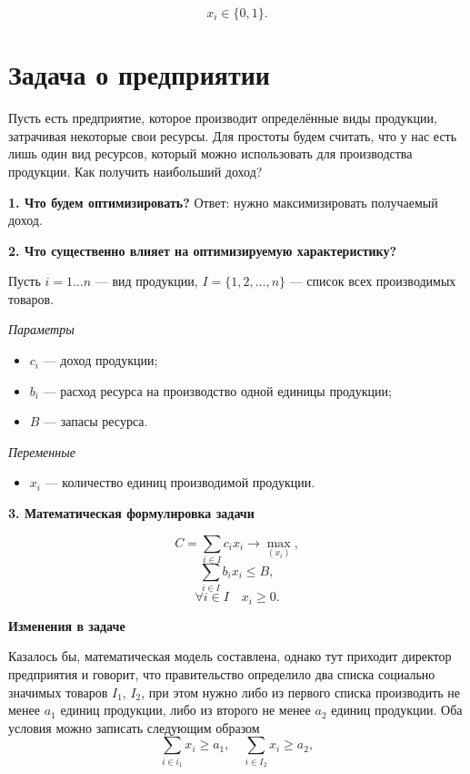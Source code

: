 \[
x_i \in \{0, 1\}.
\]

\section{Задача о предприятии}

\problem[о предприятии]

Пусть есть предприятие, которое производит определённые виды продукции, затрачивая некоторые свои ресурсы. Для простоты будем считать, что у нас есть лишь один вид ресурсов, который можно использовать для производства продукции. Как получить наибольший доход?

\mathmodel

\textbf{1. Что будем оптимизировать?} Ответ: нужно максимизировать получаемый доход.

\bigskip

\textbf{2. Что существенно влияет на оптимизируемую характеристику?}

Пусть $i = 1 \dots n$ --- вид продукции, $I = \{1, 2, \dots, n\}$ --- список всех производимых товаров.

\bigskip

\textit{Параметры}

\begin{itemize}[nosep]
	\item $c_i$ --- доход продукции;
		
	\item $b_i$ --- расход ресурса на производство одной единицы продукции;
	
	\item $B$ --- запасы ресурса.
\end{itemize}

\bigskip

\textit{Переменные}
\begin{itemize}[nosep]
	\item $x_i$ --- количество единиц производимой продукции.
\end{itemize}

\bigskip

\textbf{3. Математическая формулировка задачи}

\[
C = \sum_{i \in I}c_i x_i \to \max_{(x_i)},
\]
\[
\sum_{i \in I}b_i x_i \le B,
\]
\[
\forall i \in I \quad x_i \ge 0.
\]

\textbf{Изменения в задаче}

Казалось бы, математическая модель составлена, однако тут приходит директор предприятия и говорит, что правительство определило два списка социально значимых товаров $I_1$, $I_2$, при этом нужно либо из первого списка производить не менее $a_1$ единиц продукции, либо из второго не менее $a_2$ единиц продукции. Оба условия можно записать следующим образом
\[
\sum_{i \in i_1} x_i \ge a_1, \quad \sum_{i \in I_2} x_i \ge a_2,
\]

